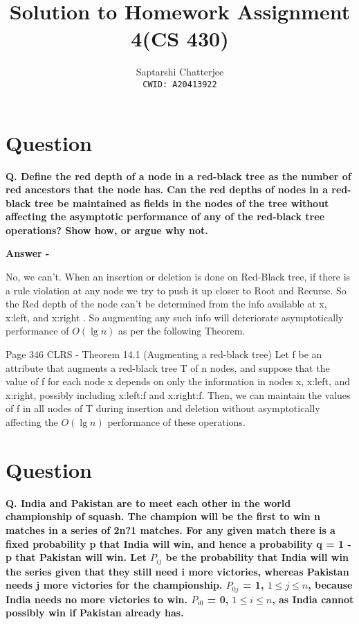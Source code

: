 \documentclass[5pt]{article}
\title{Solution to Homework Assignment 4(CS 430)}
\author{Saptarshi Chatterjee \\
\texttt{CWID: A20413922}
}
\begin{document}
\maketitle


\section{Question}
\textbf{Q. Define the red depth of a node in a red-black tree as the number of red ancestors that the node has. Can the red depths of nodes in a red-black tree be maintained as fields in the nodes of the tree without
affecting the asymptotic performance of any of the red-black tree operations? Show how, or argue why not.}

\setlength{\parskip}{1.2em}
\setlength{\parindent}{0em}

\textbf{Answer -}

No, we can't. When an insertion or deletion is done on Red-Black tree, if there is a rule violation at any node we try to push it up closer to Root and Recurse. So the Red depth of the node can't be determined from the info available at x, x:left, and x:right . So augmenting any such info will deteriorate asymptotically performance of $O(\lg n)$  as per the following Theorem.
 
Page 346 CLRS - Theorem 14.1 (Augmenting a red-black tree)
Let f be an attribute that augments a red-black tree T of n nodes, and suppose that the value of f for each node x depends on only the information in nodes x, x:left, and x:right, possibly including x:left:f and x:right:f. Then, we can maintain the values of f in all nodes of T during insertion and deletion without asymptotically affecting the $O(\lg n)$ performance of these operations.

 \section{Question}
\textbf{Q.  India and Pakistan are to meet each other in the world championship of squash. The champion will be the first to win n matches in a series of 2n?1 matches. For any given match there is a fixed probability p that India will win, and hence a probability q = 1 - p that Pakistan will win. Let $P_{ij}$ be the probability that India will win the series given that they still need i more victories, whereas Pakistan needs j more
victories for the championship. $P_{0j}$ = 1, $1 \leq j \leq n$, because India needs no more victories to win. $P_{i0}$ = 0, $1 \leq i \leq n$, as India cannot possibly win if Pakistan already has.}
\end{document}
